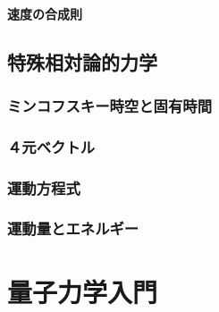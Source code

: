 \documentclass[report,paper=a4, fontsize=12pt, line_length=16cm, number_of_lines=33,dvipdfmx]{jlreq}
\numberwithin{equation}{chapter}
\begin{document}
\subsection{速度の合成則}

\chapter{特殊相対論的力学}
\section{ミンコフスキー時空と固有時間}
\section{４元ベクトル}
\section{運動方程式}
\section{運動量とエネルギー}

\part{量子力学入門}
\end{document}
